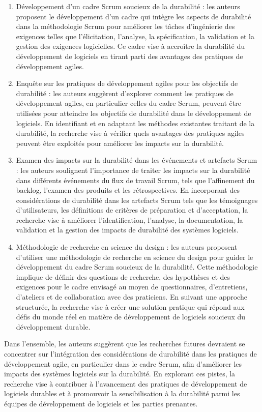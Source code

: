 \begin{enumerate}
    \item Développement d'un cadre Scrum soucieux de la durabilité : les auteurs proposent le développement d'un cadre qui intègre les aspects de durabilité dans la méthodologie Scrum pour améliorer les tâches d'ingénierie des exigences telles que l'élicitation, l'analyse, la spécification, la validation et la gestion des exigences logicielles. Ce cadre vise à accroître la durabilité du développement de logiciels en tirant parti des avantages des pratiques de développement agiles.
    \item Enquête sur les pratiques de développement agiles pour les objectifs de durabilité : les auteurs suggèrent d'explorer comment les pratiques de développement agiles, en particulier celles du cadre Scrum, peuvent être utilisées pour atteindre les objectifs de durabilité dans le développement de logiciels. En identifiant et en adaptant les méthodes existantes traitant de la durabilité, la recherche vise à vérifier quels avantages des pratiques agiles peuvent être exploités pour améliorer les impacts sur la durabilité.
    \item Examen des impacts sur la durabilité dans les événements et artefacts Scrum : les auteurs soulignent l'importance de traiter les impacts sur la durabilité dans différents événements du flux de travail Scrum, tels que l'affinement du backlog, l'examen des produits et les rétrospectives. En incorporant des considérations de durabilité dans les artefacts Scrum tels que les témoignages d'utilisateurs, les définitions de critères de préparation et d'acceptation, la recherche vise à améliorer l'identification, l'analyse, la documentation, la validation et la gestion des impacts de durabilité des systèmes logiciels.
    \item Méthodologie de recherche en science du design : les auteurs proposent d'utiliser une méthodologie de recherche en science du design pour guider le développement du cadre Scrum soucieux de la durabilité. Cette méthodologie implique de définir des questions de recherche, des hypothèses et des exigences pour le cadre envisagé au moyen de questionnaires, d'entretiens, d'ateliers et de collaboration avec des praticiens. En suivant une approche structurée, la recherche vise à créer une solution pratique qui répond aux défis du monde réel en matière de développement de logiciels soucieux du développement durable.
\end{enumerate}

Dans l’ensemble, les auteurs suggèrent que les recherches futures devraient se concentrer sur l’intégration des considérations de durabilité dans les pratiques de développement agile, en particulier dans le cadre Scrum, afin d’améliorer les impacts des systèmes logiciels sur la durabilité. En explorant ces pistes, la recherche vise à contribuer à l’avancement des pratiques de développement de logiciels durables et à promouvoir la sensibilisation à la durabilité parmi les équipes de développement de logiciels et les parties prenantes.

